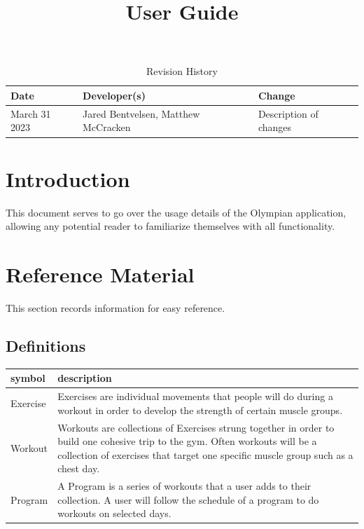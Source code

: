 \documentclass{article}
\title{User Guide\\\progname}
\author{\authname}
\date{}
\begin{document}
\begin{table}[hp]
\caption{Revision History} \label{TblRevisionHistory}
\begin{tabularx}{\textwidth}{llX}
\toprule
\textbf{Date} & \textbf{Developer(s)} & \textbf{Change}\\
\midrule
March 31 2023 & Jared Bentvelsen, Matthew McCracken & Description of changes\\
\bottomrule
\end{tabularx}
\end{table}

\newpage

\maketitle

\tableofcontents

\section{Introduction}

This document serves to go over the usage details of the Olympian application, allowing any potential reader to familiarize themselves with all functionality.

\section{Reference Material}

This section records information for easy reference.

\subsection{Definitions}

\renewcommand{\arraystretch}{1.2}
\begin{tabular}{|l|p{1\linewidth}|}
  \toprule		
  \textbf{symbol} & \textbf{description}\\
  \midrule   
  Exercise & Exercises are individual movements that people will do during a workout in order to develop the strength of certain muscle groups.\\
  Workout & Workouts are collections of Exercises strung together in order to build one cohesive trip to the gym. Often workouts will be a collection of exercises that target one specific muscle group such as a chest day.\\
  Program & A Program is a series of workouts that a user adds to their collection. A user will follow the schedule of a program to do workouts on selected days.\\
  \bottomrule
\end{tabular}\\
\end{document}
